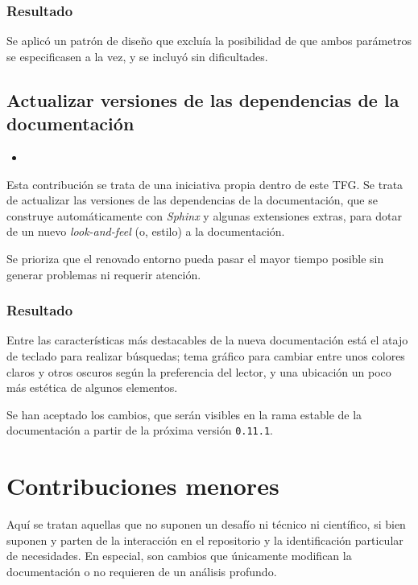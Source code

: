 \subsubsection{Resultado}

Se aplicó un patrón de diseño que excluía la posibilidad de que ambos parámetros se especificasen a la vez, y se incluyó sin dificultades.

\subsection{Actualizar versiones de las dependencias de la documentación}

\begin{itemize}
    \item {}
\end{itemize}

Esta contribución se trata de una iniciativa propia dentro de este TFG. Se trata de actualizar las versiones de las dependencias de la documentación, que se construye automáticamente con \textit{Sphinx} y algunas extensiones extras, para dotar de un nuevo \textit{look-and-feel} (o, estilo) a la documentación.

Se prioriza que el renovado entorno pueda pasar el mayor tiempo posible sin generar problemas ni requerir atención.

\subsubsection{Resultado}

Entre las características más destacables de la nueva documentación está el atajo de teclado para realizar búsquedas; tema gráfico para cambiar entre unos colores claros y otros oscuros según la preferencia del lector, y una ubicación un poco más estética de algunos elementos.

Se han aceptado los cambios, que serán visibles en la rama estable de la documentación a partir de la próxima versión \texttt{0.11.1}.

\section{Contribuciones menores} \label{sct:desarrollo:contribuciones_menores}

Aquí se tratan aquellas que no suponen un desafío ni técnico ni científico, si bien suponen y parten de la interacción en el repositorio y la identificación particular de necesidades. En especial, son cambios que únicamente modifican la documentación o no requieren de un análisis profundo.

